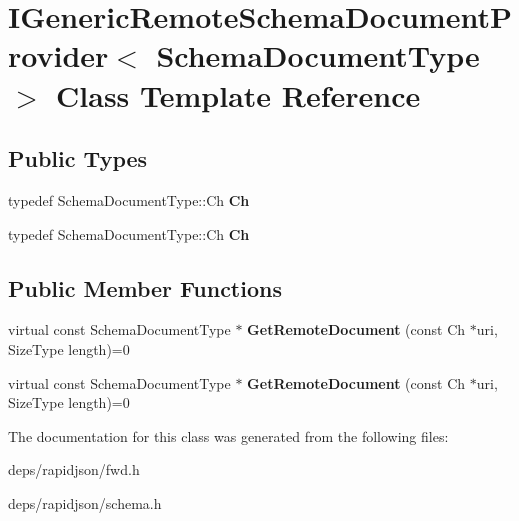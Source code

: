 \hypertarget{class_i_generic_remote_schema_document_provider}{}\section{I\+Generic\+Remote\+Schema\+Document\+Provider$<$ Schema\+Document\+Type $>$ Class Template Reference}
\label{class_i_generic_remote_schema_document_provider}
\subsection*{Public Types}
\begin{DoxyCompactItemize}
\item 
typedef Schema\+Document\+Type\+::\+Ch {\bfseries Ch}\hypertarget{class_i_generic_remote_schema_document_provider_acfcd5492c3df8ff56cd2d84d36cc0ceb}{}\label{class_i_generic_remote_schema_document_provider_acfcd5492c3df8ff56cd2d84d36cc0ceb}

\item 
typedef Schema\+Document\+Type\+::\+Ch {\bfseries Ch}\hypertarget{class_i_generic_remote_schema_document_provider_acfcd5492c3df8ff56cd2d84d36cc0ceb}{}\label{class_i_generic_remote_schema_document_provider_acfcd5492c3df8ff56cd2d84d36cc0ceb}

\end{DoxyCompactItemize}
\subsection*{Public Member Functions}
\begin{DoxyCompactItemize}
\item 
virtual const Schema\+Document\+Type $\ast$ {\bfseries Get\+Remote\+Document} (const Ch $\ast$uri, Size\+Type length)=0\hypertarget{class_i_generic_remote_schema_document_provider_aad112a069dd57fe850fafd04cbb4777b}{}\label{class_i_generic_remote_schema_document_provider_aad112a069dd57fe850fafd04cbb4777b}

\item 
virtual const Schema\+Document\+Type $\ast$ {\bfseries Get\+Remote\+Document} (const Ch $\ast$uri, Size\+Type length)=0\hypertarget{class_i_generic_remote_schema_document_provider_aad112a069dd57fe850fafd04cbb4777b}{}\label{class_i_generic_remote_schema_document_provider_aad112a069dd57fe850fafd04cbb4777b}

\end{DoxyCompactItemize}


The documentation for this class was generated from the following files\+:\begin{DoxyCompactItemize}
\item 
deps/rapidjson/fwd.\+h\item 
deps/rapidjson/schema.\+h\end{DoxyCompactItemize}
